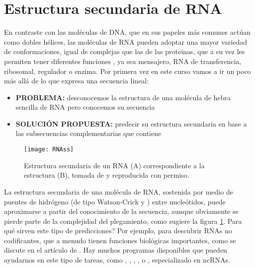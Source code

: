 \section{Estructura secundaria de RNA} \label{SSRNA}

En contraste con las mol\'{e}culas de DNA, que en sus papeles m\'{a}s comunes act\'{u}an como dobles h\'{e}lices,
las mol\'{e}culas de RNA pueden adoptar una mayor variedad de conformaciones, igual de complejas que las de
las prote\'{i}nas, que a su vez les permiten tener diferentes funciones , ya sea mensajero, RNA de transferencia,
ribosomal, regulador o enzima. Por primera vez en este curso vamos a ir un poco m\'{a}s all\'{a} de lo que expresa
una secuencia lineal:

\begin{itemize}
\item \textbf{PROBLEMA:} desconocemos la estructura de una mol\'{e}cula de hebra sencilla de RNA pero conocemos su secuencia
\item \textbf{SOLUCI\'{O}N PROPUESTA:} predecir su estructura secundaria en base a las subsecuencias complementarias que contiene
\end{itemize}

\begin{figure}
\begin{center} 
\texttt{[image: RNAss]}
\caption%
{
Estructura secundaria de un RNA (A) correspondiente a la estructura (B), tomada de \cite{Noller2004} y reproducida con permiso.
}
\label{fig:RNAss}
\end{center}
\end{figure}

La estructura secundaria de una mol\'{e}cula de RNA, sostenida por medio de 
puentes de hidr\'{o}geno (de tipo Watson-Crick y
) entre nucle\'{o}tidos,
puede aproximarse a partir del conocimiento de la secuencia, aunque obviamente se pierde parte de la complejidad
del plegamiento, como sugiere la figura \ref{fig:RNAss}. Para qu\'{e} sirven este tipo de predicciones? 
Por ejemplo, para descubrir RNAs no codificantes, que a menudo tienen funciones biol\'{o}gicas importantes, 
como se discute en el art\'{i}culo de \cite{Washietl2005}.
Hay muchos programas disponibles que pueden ayudarnos en este tipo de tareas, como 
,
,
,
, 
 o
, especializado en ncRNAs.

